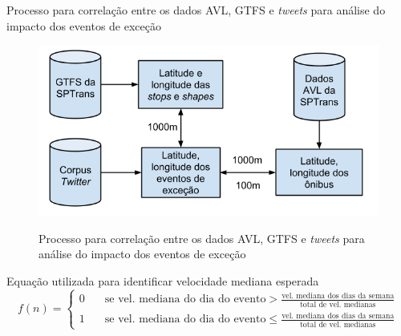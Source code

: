 \documentclass{beamer}
\begin{document}
\begin{frame}{Processo para correlação entre os dados AVL, GTFS e \textit{tweets} para análise do impacto dos eventos de exceção}
\begin{figure}[!htb]
	\centering
 	  \caption{Processo para correlação entre os dados AVL, GTFS e \textit{tweets} para análise do impacto dos eventos de exceção}
		\includegraphics[width=1\linewidth]{avl_tweets_correlation_pt.png}
	\label{fig:avl_tweets_correlation_pt}
\end{figure} 
\end{frame}
\begin{frame}{Equação utilizada para identificar velocidade mediana esperada}
    \begin{equation}
\label{eqVeloc}
 f(n) =
  \begin{cases}
    0      & \quad \text{se  vel.~mediana~do~dia~do~evento} > \frac{\text{vel.~mediana~dos~dias~da~semana}}{\text{total~de~vel.~medianas}}\\
    1 & \quad \text{se vel.~mediana~do~dia~do~evento} \leq \frac{\text{vel.~mediana~dos~dias~da~semana}}{\text{total~de~vel.~medianas}}
  \end{cases}
\end{equation}
\end{frame}
\end{document}
